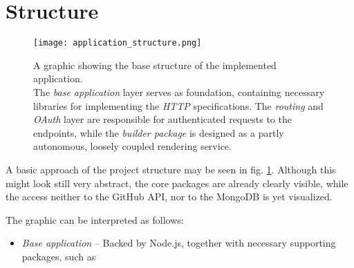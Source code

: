 \section{Structure}
\label{sec:structure}

\begin{figure}[b] %
    \centering
    \texttt{[image: application\_structure.png]}
    \caption{A graphic showing the base structure of the implemented application.\\ The \emph{base application} layer serves as foundation, containing necessary libraries for implementing the \emph{HTTP} specifications. The \emph{routing} and \emph{OAuth} layer are responsible for authenticated requests to the endpoints, while the \emph{builder package} is designed as a partly autonomous, loosely coupled rendering service.}
    \label{fig:application_structure}
\end{figure}
%

A basic approach of the project structure may be seen in fig. \ref{fig:application_structure}. Although this might look still very abstract, the core packages are already clearly visible, while the access neither to the GitHub API, nor to the MongoDB is yet visualized.

The graphic can be interpreted as follows:

\begin{itemize}
  \item \emph{Base application} -- Backed by Node.js, together with necessary supporting packages, such as %
\end{itemize}
